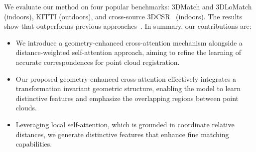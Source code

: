 We evaluate our method on four popular benchmarks:
3DMatch \cite{zeng20173dmatch} and 3DLoMatch \cite{huang2021predator} (indoors), KITTI \cite{geiger2012we} (outdoors), and cross-source 3DCSR~\cite{huang2021comprehensive} (indoors).
The results show that \ourmethod outperforms previous approaches~\cite{huang2021predator,yu2021cofinet,qin2022geometric}.
In summary, our contributions are:
\begin{itemize}[noitemsep,topsep=0pt]

\item We introduce a geometry-enhanced cross-attention mechanism alongside a distance-weighted self-attention approach, aiming to refine the learning of accurate correspondences for point cloud registration.
\item Our proposed geometry-enhanced cross-attention effectively integrates a transformation invariant geometric structure, enabling the model to learn distinctive features and emphasize the overlapping regions between point clouds.
\item Leveraging local self-attention, which is grounded in coordinate relative distances, we generate distinctive features that enhance fine matching capabilities.
\end{itemize}
